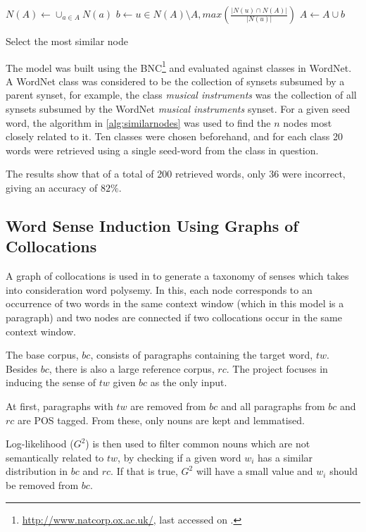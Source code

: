 \begin{algorithm}
 \begin{algorithmic}
  \State $N(A) \gets \cup_{a \in A} N(a)$
  \State $b \gets u \in N(A) \setminus A, max(\frac{|N(u) \cap N(A)|}{|N(u)|})$
  \State $A \gets A \cup b$
 \end{algorithmic}
 \caption{\label{alg:similarnodes} Select the most similar node}
\end{algorithm}

The model was built using the 
\ac{BNC}\footnote{\url{http://www.natcorp.ox.ac.uk/}, last accessed on 
.} and evaluated against classes in WordNet. A WordNet 
class was considered to be the collection of synsets subsumed by a parent 
synset, for example, the class \textit{musical instruments} was the collection 
of all synsets subsumed by the WordNet \textit{musical instruments} synset. For 
a given seed word, the algorithm in \ref{alg:similarnodes} was used 
to find the $n$ nodes most closely related to it. Ten classes were chosen 
beforehand, and for each class 20 words were retrieved using a single seed-word 
from the class in question.

The results show that of a total of 200 retrieved words, only 36 were
incorrect, giving an accuracy of $82\%$.

\subsection{Word Sense Induction Using Graphs of Collocations}
\label{sec:collocations}

A graph of collocations is used in \citep{klapaftis2008word} to generate a
taxonomy of senses which takes into consideration word polysemy. In this, each
node corresponds to an occurrence of two words in the same context window (which
in this model is a paragraph) and two nodes are connected if two collocations
occur in the same context window.

The base corpus, $bc$, consists of paragraphs containing the target word, $tw$.
Besides $bc$, there is also a large reference corpus, $rc$. The project focuses
in inducing the sense of $tw$ given $bc$ as the only input.

At first, paragraphs with $tw$ are removed from $bc$ and all paragraphs from
$bc$ and $rc$ are \ac{POS} tagged. From these, only nouns are kept and
lemmatised.

Log-likelihood ($G^2$) \citep{dunning1993accurate} is then used to filter 
common nouns which are not semantically related to $tw$, by checking if a given 
word $w_i$ has a similar distribution in $bc$ and $rc$. If that is true, $G^2$ 
will have a small value and $w_i$ should be removed from $bc$.

